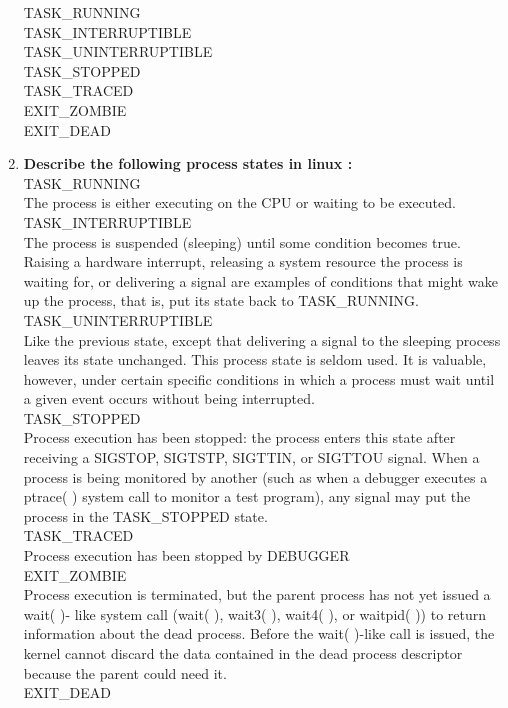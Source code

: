 \documentclass[a4paper,12pt]{article}
\begin{document}
\begin{flushleft}
\begin{enumerate}
{\color{red}TASK\_RUNNING\\
TASK\_INTERRUPTIBLE\\
TASK\_UNINTERRUPTIBLE\\
TASK\_STOPPED\\
TASK\_TRACED\\
EXIT\_ZOMBIE\\
EXIT\_DEAD\\}
\item \textbf{ Describe the following process states in linux :}\\
TASK\_RUNNING\\
{\color{red}The process is either executing on the CPU or waiting to be executed.}
\\TASK\_INTERRUPTIBLE\\
{\color{red}The process is suspended (sleeping) until some condition becomes true. Raising a
hardware interrupt, releasing a system resource the process is waiting for, or
delivering a signal are examples of conditions that might wake up the process, that is,
put its state back to TASK\_RUNNING.}
\\TASK\_UNINTERRUPTIBLE\\
{\color{red}Like the previous state, except that delivering a signal to the sleeping process leaves
its state unchanged. This process state is seldom used. It is valuable, however, under
certain specific conditions in which a process must wait until a given event occurs
without being interrupted. }
\\TASK\_STOPPED\\
{\color{red}Process execution has been stopped: the process enters this state after receiving a
SIGSTOP, SIGTSTP, SIGTTIN, or SIGTTOU signal. When a process is being monitored
by another (such as when a debugger executes a ptrace( ) system call to monitor a
test program), any signal may put the process in the TASK\_STOPPED state.}
\\TASK\_TRACED\\
{\color{red}Process execution has been stopped by DEBUGGER}
\\EXIT\_ZOMBIE\\
{\color{red}Process execution is terminated, but the parent process has not yet issued a wait( )-
like system call (wait( ), wait3( ), wait4( ), or waitpid( )) to return
information about the dead process. Before the wait( )-like call is issued, the kernel
cannot discard the data contained in the dead process descriptor because the parent
could need it.}
\\EXIT\_DEAD\\

\end{enumerate}
\end{flushleft}
\end{document}
